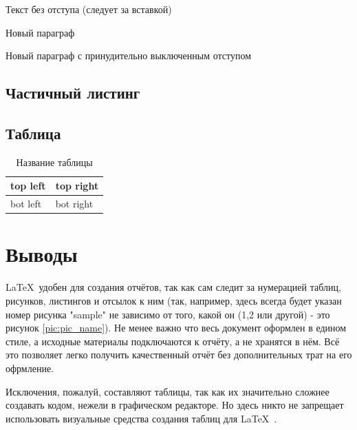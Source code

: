 
\parindent=1cm %
Текст без отступа (следует за вставкой)

Новый параграф

\noindent Новый параграф с принудительно выключенным отступом


\subsection{Частичный листинг}
\makeatletter
\def\lst@PlaceNumber{\llap{\normalfont
                \lst@numberstyle{\the\lst@lineno}\kern\lst@numbersep}}
\makeatother


\parindent=1cm

\subsection{Таблица}

\begin{table}[H]
	\begin{center}
		\begin{tabular}{|l|l|}
			\hline
			top left & top right\\ \hline
			bot left & bot right\\ \hline
		\end{tabular}
		\caption{ Название таблицы}
		\label{tabular:tab_examp}
	\end{center}
\end{table}

\section{Выводы}
\LaTeX\ удобен для создания отчётов, так как сам следит за нумерацией таблиц, рисунков, листингов и отсылок к ним (так, например, здесь всегда будет указан номер рисунка "sample" не зависимо от того, какой он (1,2 или другой) - это рисунок \ref{pic:pic_name}). Не менее важно что весь документ оформлен в едином стиле, а исходные материалы подключаются к отчёту, а не хранятся в нём. Всё это позволяет легко получить качественный отчёт без дополнительных трат на его офрмление.

Исключения, пожалуй, составляют таблицы, так как их значительно сложнее создавать кодом, нежели в графическом редакторе. Но здесь никто не запрещает использовать визуальные средства создания таблиц для \LaTeX\ .

